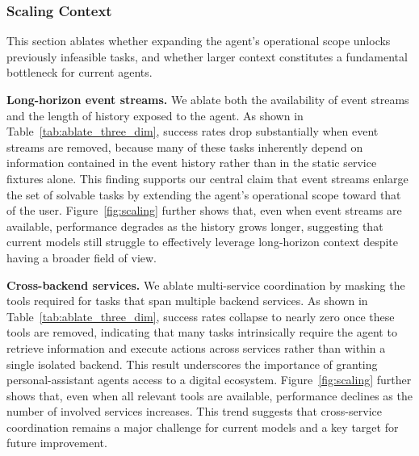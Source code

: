 \documentclass{article}
\begin{document}
\subsubsection{Scaling Context}
\label{sec:ab_scaling_context}
This section ablates whether expanding the agent's operational scope unlocks previously infeasible tasks, and whether larger context constitutes a fundamental bottleneck for current agents.

\textbf{Long-horizon event streams.} We ablate both the availability of event streams and the length of history exposed to the agent. As shown in Table~\ref{tab:ablate_three_dim}, success rates drop substantially when event streams are removed, because many of these tasks inherently depend on information contained in the event history rather than in the static service fixtures alone. This finding supports our central claim that event streams enlarge the set of solvable tasks by extending the agent's operational scope toward that of the user. Figure~\ref{fig:scaling} further shows that, even when event streams are available, performance degrades as the history grows longer, suggesting that current models still struggle to effectively leverage long-horizon context despite having a broader field of view.

\textbf{Cross-backend services.} We ablate multi-service coordination by masking the tools required for tasks that span multiple backend services. As shown in Table~\ref{tab:ablate_three_dim}, success rates collapse to nearly zero once these tools are removed, indicating that many tasks intrinsically require the agent to retrieve information and execute actions across services rather than within a single isolated backend. This result underscores the importance of granting personal-assistant agents access to a digital ecosystem. Figure~\ref{fig:scaling} further shows that, even when all relevant tools are available, performance declines as the number of involved services increases. This trend suggests that cross-service coordination remains a major challenge for current models and a key target for future improvement.
\end{document}
